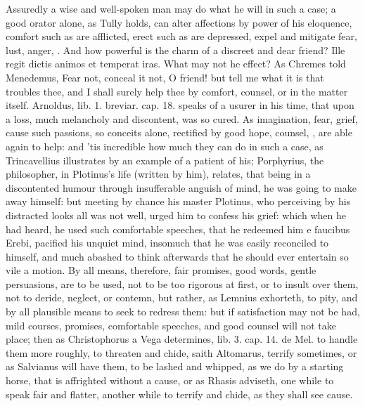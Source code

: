 {Assuredly a wise and well-spoken man may do what he will in such a
case; a good orator alone, as Tully holds, can alter affections
by power of his eloquence, comfort such as are afflicted, erect such as
are depressed, expel and mitigate fear, lust, anger, \etc{}. And how
powerful is the charm of a discreet and dear friend? Ille regit dictis
animos et temperat iras. What may not he effect? As Chremes told
Menedemus, Fear not, conceal it not, O friend! but tell me what it is
that troubles thee, and I shall surely help thee by comfort, counsel,
or in the matter itself.  Arnoldus, lib. 1. breviar. cap. 18.
speaks of a usurer in his time, that upon a loss, much melancholy and
discontent, was so cured. As imagination, fear, grief, cause such
passions, so conceits alone, rectified by good hope, counsel, \etc{}, are
able again to help: and 'tis incredible how much they can do in such a
case, as Trincavellius illustrates by an example of a patient of
his; Porphyrius, the philosopher, in Plotinus's life (written by him),
relates, that being in a discontented humour through insufferable
anguish of mind, he was going to make away himself: but meeting by
chance his master Plotinus, who perceiving by his distracted looks all
was not well, urged him to confess his grief: which when he had heard,
he used such comfortable speeches, that he redeemed him e faucibus
Erebi, pacified his unquiet mind, insomuch that he was easily
reconciled to himself, and much abashed to think afterwards that he
should ever entertain so vile a motion. By all means, therefore, fair
promises, good words, gentle persuasions, are to be used, not to be too
rigorous at first, or to insult over them, not to deride,
neglect, or contemn, but rather, as Lemnius exhorteth, to pity, and by
all plausible means to seek to redress them: but if satisfaction may
not be had, mild courses, promises, comfortable speeches, and good
counsel will not take place; then as Christophorus a Vega determines,
lib. 3. cap. 14. de Mel. to handle them more roughly, to threaten and
chide, saith Altomarus, terrify sometimes, or as Salvianus will
have them, to be lashed and whipped, as we do by a starting horse,
that is affrighted without a cause, or as Rhasis adviseth,
one while to speak fair and flatter, another while to terrify and
chide, as they shall see cause.

}

